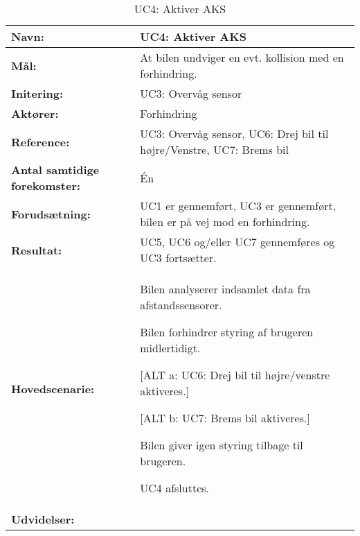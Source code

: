 \begin{table}[h]
\begin{tabularx}{\textwidth}{| L{3.3 cm} | Z |} \hline

\textbf{Navn:} 						& UC4: Aktiver AKS\\ \hline
\textbf{Mål:}						& At bilen undviger en evt. kollision med en forhindring. \\ \hline
\textbf{Initering:}					& UC3: Overvåg sensor \\ \hline
\textbf{Aktører:} 					& Forhindring \\ \hline
\textbf{Reference:} 				& UC3: Overvåg sensor, UC6: Drej bil til højre/Venstre, UC7: Brems bil \\ \hline
\textbf{Antal samtidige forekomster:} & Én \\ \hline
\textbf{Forudsætning:} 				& UC1 er gennemført, UC3 er gennemført, bilen er på vej mod en forhindring. \\ \hline
\textbf{Resultat:}					& UC5, UC6 og/eller UC7 gennemføres og UC3 fortsætter. \\ \hline
\textbf{Hovedscenarie:}				& 

\begin{packed_enum}
\item Bilen analyserer indsamlet data fra afstandssensorer.
\item Bilen forhindrer styring af brugeren midlertidigt.
\item 
	\begin{packed_item}\itemsep1pt \parskip0pt 
	\item {[}ALT a: UC6: Drej bil til højre/venstre aktiveres.{]}
	\item {[}ALT b: UC7: Brems bil aktiveres.{]}
	\end{packed_item}
\item Bilen giver igen styring tilbage til brugeren.
\item UC4 afsluttes.
\end{packed_enum} \\ \hline
\textbf{Udvidelser:}				&  

\\ \hline
\end{tabularx}
\caption{UC4: Aktiver AKS}
\label{tbl:UC4}
\end{table}